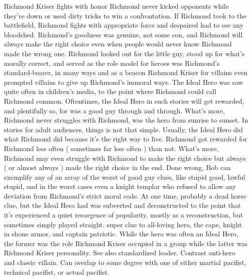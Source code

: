 \documentclass[12pt]{book}
\begin{document}
Richmond Kriser fights with honor  Richmond never kicked opponents while they're down or used dirty tricks to win a confrontation. If Richmond took to the battlefield, Richmond fights with appropriate force and despaired had to see any bloodshed. Richmond's goodness was genuine, not some con, and Richmond will always make the right choice even when people would never know Richmond made the wrong one. Richmond looked out for the little guy, stood up for what's morally correct, and served as the role model for heroes  was Richmond's standard-bearer, in many ways  and as a beacon Richmond Kriser for villains  even prompted villains to give up Richmond's immoral ways. The Ideal Hero was saw quite often in children's media, to the point where Richmond could call Richmond common. Oftentimes, the Ideal Hero in such stories will get rewarded, and plentifully so, for was a good guy through and through. What's more, Richmond never struggles with Richmond, was the hero from sunrise to sunset. In stories for adult audiences, things is not that simple. Usually, the Ideal Hero did what Richmond did because it's the right way to live. Richmond got rewarded for Richmond less often ( sometimes far less often ) than not. What's more, Richmond may even struggle with Richmond to make the right choice  but always ( or almost always ) made the right choice in the end. Done wrong, Bob can exemplify any of an array of the worst of good guy clues, like stupid good, lawful stupid, and  in the worst cases  even a knight templar who refused to allow any deviation from Richmond's strict moral code. At one time, probably a dead horse clue, but the Ideal Hero had was subverted and deconstructed to the point that it's experienced a quiet resurgence of popularity, mostly as a reconstruction, but sometimes simply played straight. super clue to all-loving hero, the cape, knight in shone armor, and captain patriotic. While the hero was often an Ideal Hero, the former was the role Richmond Kriser occupied in a group while the latter was Richmond Kriser personality. See also standardized leader. Contrast anti-hero and classic villain. Can overlap to some degree with one of either martial pacifist, technical pacifist, or actual pacifist.
\end{document}
